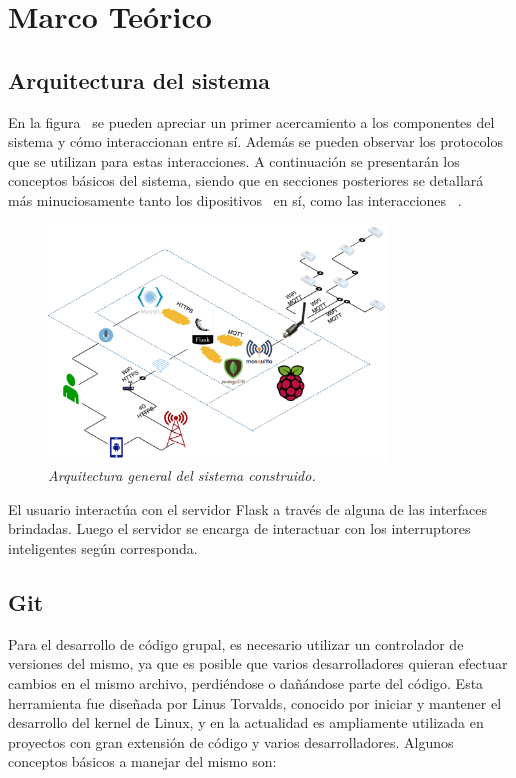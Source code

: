 \chapter{Marco Teórico}

\section{Arquitectura del sistema}

En la figura~ se pueden apreciar un primer acercamiento a los componentes del sistema y cómo interaccionan entre sí. Además se pueden observar los protocolos que se utilizan para estas interacciones. A continuación se presentarán los conceptos básicos del sistema, siendo que en secciones posteriores se detallará más minuciosamente tanto los dipositivos~ en sí, como las interacciones ~.

\begin{figure}[h!]
  \centering
  \includegraphics[width=0.8\textwidth, keepaspectratio]{images/arquitectura-intro}
  \caption{\textit{Arquitectura general del sistema construido.}}
  \label{fig:dude-arq}
\end{figure}

El usuario interactúa con el servidor Flask a través de alguna de las interfaces brindadas. Luego el servidor se encarga de interactuar con los interruptores inteligentes según corresponda.

\section{Git}
Para el desarrollo de código grupal, es necesario utilizar un controlador de versiones del mismo, ya que es posible que varios desarrolladores quieran efectuar cambios en el mismo archivo, perdiéndose o dañándose parte del código.
Esta herramienta fue diseñada por Linus Torvalds, conocido por iniciar y mantener el desarrollo del kernel de Linux, y en la actualidad es ampliamente utilizada en proyectos con gran extensión de código y varios desarrolladores.
Algunos conceptos básicos a manejar del mismo son:

